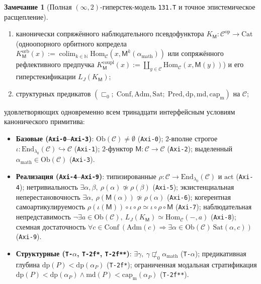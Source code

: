 \documentclass[11pt]{article}
\theoremstyle{plain}
\theoremstyle{definition}
\newtheorem{remark}[theorem]{Замечание}
\newcommand{\cC}{\mathcal{C}}
\newcommand{\Ob}{\mathrm{Ob}}
\newcommand{\Hom}{\mathrm{Hom}}
\newcommand{\Cat}{\mathrm{Cat}}
\DeclareMathOperator{\colim}{colim}
\begin{document}
\begin{remark}[Полная $(\infty,2)$-гиперстек-модель \texttt{131.T} и точное эпистемическое расщепление]
\begin{enumerate}[nosep,label=(\arabic*)]
\item канонически сопряжённого наблюдательного псевдофунктора $K_{\mathsf{M}} : \cC^{\mathrm{op}} \to \Cat$ (одноопорного орбитного копредела $K_{\mathsf{M}}^{\mathrm{orb}}(x) := \colim_{k \in \mathbb{N}} \Hom_{\cC}(x, \mathsf{M}^k(\alpha_{\mathrm{math}}))$ или сопряжённого рефлективного предпучка $K_{\mathsf{M}}^{\mathrm{coupl}}(x) := \coprod_{y \in \cC} \Hom_{\cC}(x, \mathsf{M}(y))$) и его гиперстекификации $L_J(K_{\mathsf{M}})$;
\item структурных предикатов $(\sqsubset_0;\; \mathrm{Conf}, \mathrm{Adm}, \mathrm{Sat};\; \mathrm{Pred}, \mathrm{dp}, \mathrm{md}, \mathrm{cap}_{\mathrm{m}})$ на $\cC$;
\end{enumerate}
удовлетворяющих одновременно всем тринадцати интерфейсным условиям канонического примитива:
\begin{itemize}[nosep]
\item \textbf{Базовые (\texttt{Axi-0}--\texttt{Axi-3})}: $\Ob(\cC) \neq \emptyset$ (\texttt{Axi-0}); $2$-вполне строгое $\iota : \mathrm{End}_{\lambda_0}(\cC) \hookrightarrow \cC$ (\texttt{Axi-1}); $2$-функтор $\mathsf{M} : \cC \to \cC$ (\texttt{Axi-2}); выделенный $\alpha_{\mathrm{math}} \in \Ob(\cC)$ (\texttt{Axi-3}).
\item \textbf{Реализация (\texttt{Axi-4}--\texttt{Axi-9})}: типизированные $\rho : \cC \to \mathrm{End}_{\lambda_0}(\cC)$ и $\mathrm{act}$ (\texttt{Axi-4}); нетривиальность $\exists \alpha, \beta,\ \rho(\alpha) \not\simeq \rho(\beta)$ (\texttt{Axi-5}); экзистенциальная неперестановочность $\exists \alpha,\ \rho(\mathsf{M}(\alpha)) \not\simeq \rho(\alpha)$ (\texttt{Axi-6}); когерентная самоартикулируемость $\rho(\iota(\mathsf{M})) \circ \iota \circ \rho \simeq \iota \circ \rho \circ \mathsf{M}$ (\texttt{Axi-7}); наблюдательная непредставимость $\neg \exists a \in \Ob(\cC),\ L_J(K_{\mathsf{M}}) \simeq \Hom_{\cC}(-, a)$ (\texttt{Axi-8}); схемная достаточность $\forall c \in \mathrm{Conf}\ (\mathrm{Adm}(c) \Rightarrow \exists \alpha \in \Ob(\cC)\ \mathrm{Sat}(\alpha, c))$ (\texttt{Axi-9}).
\item \textbf{Структурные (\texttt{T-$\alpha$}, \texttt{T-2f*}, \texttt{T-2f**})}: $\exists \gamma,\ \gamma \not\sqsubset_0 \alpha_{\mathrm{math}}$ (\texttt{T-$\alpha$}); предикативная глубина $\mathrm{dp}(P) < \mathrm{dp}(\alpha_P)$ (\texttt{T-2f*}); ограниченная модальная стратификация $\mathrm{dp}(P) < \mathrm{dp}(\alpha_P) \wedge \mathrm{md}(P) < \mathrm{cap}_{\mathrm{m}}(\alpha_P)$ (\texttt{T-2f**}).
\end{itemize}


\end{remark}
\end{document}
